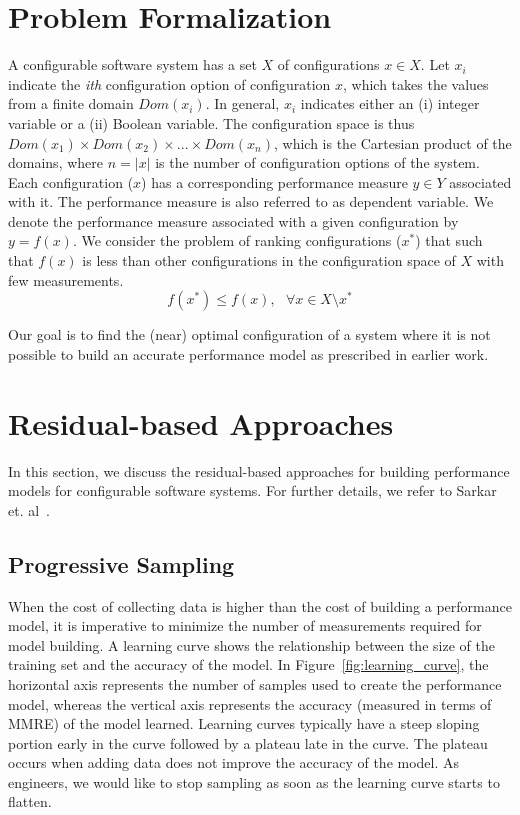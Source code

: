 \section{Problem Formalization}\label{sec:problem_formal}

A configurable software system has a set $X$ of configurations $x \in X$. Let $x_i$ indicate the \textit{ith} configuration option of configuration $x$, which takes the values from a finite domain $Dom(x_i)$. In general, $x_i$ indicates either an (i) integer variable or a (ii) Boolean variable. The configuration space is thus $Dom(x_1) \times Dom(x_2) \times ... \times Dom(x_n)$, which is the Cartesian product of the domains, where $n = |x|$ is the number of configuration options of the system. Each configuration ($x$) has a corresponding performance measure $y \in Y$ associated with it. The performance measure is also referred to as dependent variable. We denote the performance measure associated with a given configuration by $y=f(x)$.  We consider the problem of ranking  configurations ($x^*$) that such that $f(x)$ is less than other configurations in the configuration space of $X$ with few measurements.
\begin{equation}
    f(x^*) \le f(x),~~~ \forall x \in {X\setminus x^*}
\end{equation}
 
 Our goal is to find the (near) optimal configuration of a system where it is not possible to build an accurate performance model as prescribed in earlier work.

\section{Residual-based Approaches}\label{sec:residual}

In this section, we discuss the residual-based approaches for building performance models for configurable software systems. For further details, we refer to Sarkar et. al~\cite{sarkar2015cost}.




\subsection{Progressive Sampling}
When the cost of collecting data is higher than the cost of building a performance model, it is imperative to minimize the number of measurements required for model building. A learning curve shows the relationship between the size of the training set and the accuracy of the model. In Figure~\ref{fig:learning_curve}, the horizontal axis represents the number of samples used to create the performance model, whereas the vertical axis represents the accuracy (measured in terms of MMRE) of the model learned. 
Learning curves typically have a steep sloping portion early in the curve followed by a plateau late in the curve. The plateau occurs when adding data does not improve the accuracy of the model. As engineers, we would like to stop sampling as soon as the learning curve starts to flatten.




